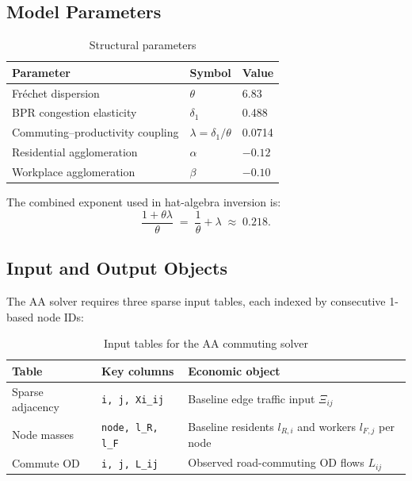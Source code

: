 \documentclass[12pt, a4paper]{article}
\begin{document}
\subsection{Model Parameters}

\begin{table}[H]
\centering
\caption{Structural parameters}
\label{tab:params}
\begin{tabular}{lll}
\toprule
Parameter & Symbol & Value \\
\midrule
Fr\'echet dispersion         & $\theta$    & 6.83 \\
BPR congestion elasticity  & $\delta_1$  & 0.488 \\
Commuting--productivity coupling & $\lambda = \delta_1/\theta$ & 0.0714 \\
Residential agglomeration  & $\alpha$    & $-0.12$ \\
Workplace agglomeration    & $\beta$     & $-0.10$ \\
\bottomrule
\end{tabular}
\end{table}

The combined exponent used in hat-algebra inversion is:
\begin{equation}
  \frac{1 + \theta\lambda}{\theta} \;=\; \frac{1}{\theta} + \lambda \;\approx\; 0.218.
  \label{eq:exponent}
\end{equation}

\subsection{Input and Output Objects}

The AA solver requires three sparse input tables, each indexed by
consecutive 1-based node IDs:

\begin{table}[H]
\centering
\caption{Input tables for the AA commuting solver}
\label{tab:inputs}
\begin{tabular}{lll}
\toprule
Table & Key columns & Economic object \\
\midrule
Sparse adjacency
  & \texttt{i, j, Xi\_ij}
  & Baseline edge traffic input $\Xi_{ij}$ \\
Node masses
  & \texttt{node, l\_R, l\_F}
  & Baseline residents $l_{R,i}$ and workers $l_{F,j}$ per node \\
Commute OD
  & \texttt{i, j, L\_ij}
  & Observed road-commuting OD flows $L_{ij}$ \\
\bottomrule
\end{tabular}
\end{table}
\end{document}
